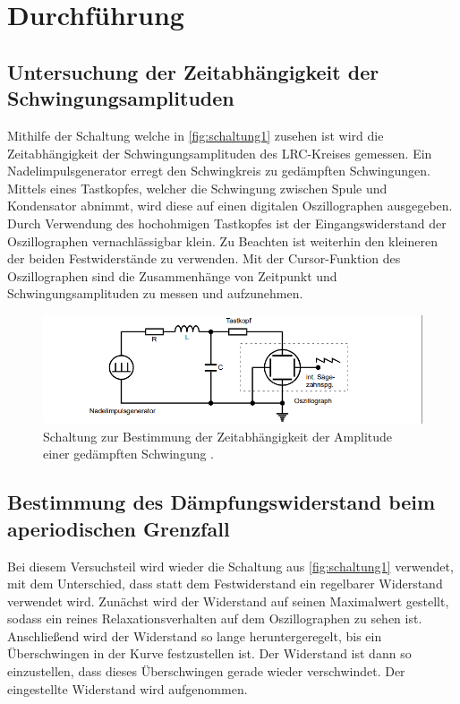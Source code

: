 \section{Durchführung}
\label{sec:Durchführung}
    \subsection{Untersuchung der Zeitabhängigkeit der Schwingungsamplituden}
        Mithilfe der Schaltung welche in \autoref{fig:schaltung1} zusehen ist wird die Zeitabhängigkeit der Schwingungsamplituden des LRC-Kreises gemessen.
        Ein Nadelimpulsgenerator erregt den Schwingkreis zu gedämpften Schwingungen. Mittels eines Tastkopfes, welcher die Schwingung zwischen Spule
        und Kondensator abnimmt, wird diese auf einen digitalen Oszillographen ausgegeben. Durch Verwendung des hochohmigen Tastkopfes ist der 
        Eingangswiderstand der Oszillographen vernachlässigbar klein. 
        Zu Beachten ist weiterhin den kleineren der beiden Festwiderstände zu verwenden.
        Mit der Cursor-Funktion des Oszillographen sind die Zusammenhänge von Zeitpunkt und Schwingungsamplituden zu messen und aufzunehmen.
        \begin{figure}
            \centering
            \includegraphics[width=\textwidth]{content/s1.png}
            \caption{Schaltung zur Bestimmung der Zeitabhängigkeit der Amplitude einer gedämpften Schwingung \cite[294]{V354}.}
            \label{fig:schaltung1}
        \end{figure} 
    \subsection{Bestimmung des Dämpfungswiderstand beim aperiodischen Grenzfall}    
        Bei diesem Versuchsteil wird wieder die Schaltung aus \autoref{fig:schaltung1} verwendet, mit dem Unterschied, dass statt dem Festwiderstand
        ein regelbarer Widerstand verwendet wird. Zunächst wird der Widerstand auf seinen Maximalwert gestellt, sodass ein reines Relaxationsverhalten
        auf dem Oszillographen zu sehen ist. Anschließend wird der Widerstand so lange heruntergeregelt, bis ein Überschwingen in der Kurve festzustellen ist.
        Der Widerstand ist dann so einzustellen, dass dieses Überschwingen gerade wieder verschwindet. Der eingestellte Widerstand wird aufgenommen.

